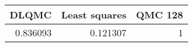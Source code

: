 \begin{tabular}{rrr}
\toprule
    DLQMC &   Least squares &   QMC 128 \\
\midrule
 0.836093 &        0.121307 &         1 \\
\bottomrule
\end{tabular}
